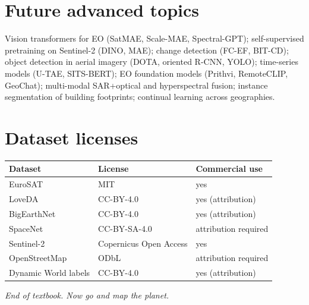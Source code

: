 \section{Future advanced topics}

Vision transformers for EO (SatMAE, Scale-MAE, Spectral-GPT);
self-supervised pretraining on Sentinel-2 (DINO, MAE);
change detection (FC-EF, BIT-CD); object detection in aerial imagery
(DOTA, oriented R-CNN, YOLO); time-series models (U-TAE, SITS-BERT);
EO foundation models (Prithvi, RemoteCLIP, GeoChat);
multi-modal SAR+optical and hyperspectral fusion; instance segmentation of
building footprints; continual learning across geographies.

\section{Dataset licenses}

\begin{center}\small
\renewcommand{\arraystretch}{1.15}
\begin{tabular}{@{}lll@{}}
\toprule
Dataset & License & Commercial use\\
\midrule
EuroSAT & MIT & yes\\
LoveDA & CC-BY-4.0 & yes (attribution)\\
BigEarthNet & CC-BY-4.0 & yes (attribution)\\
SpaceNet & CC-BY-SA-4.0 & attribution required\\
Sentinel-2 & Copernicus Open Access & yes\\
OpenStreetMap & ODbL & attribution required\\
Dynamic World labels & CC-BY-4.0 & yes (attribution)\\
\bottomrule
\end{tabular}
\end{center}

\vfill
\begin{center}\itshape
End of textbook. Now go and map the planet.
\end{center}
